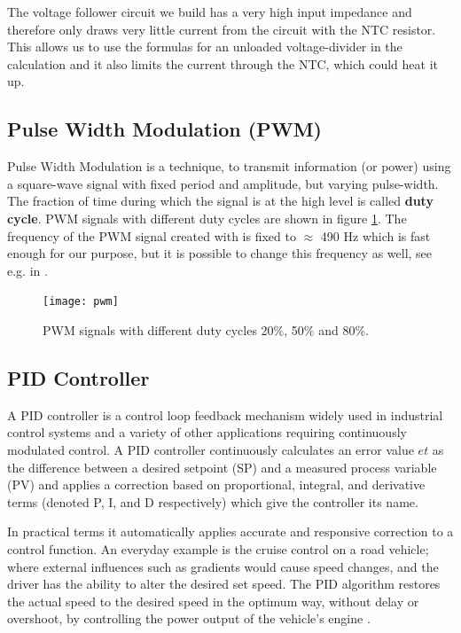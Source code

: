 The voltage follower circuit we build has a very high input impedance and therefore only draws very little current from the circuit with the NTC resistor. This allows us to use the formulas for an unloaded voltage-divider in the calculation and it also limits the current through the NTC, which could heat it up.

\subsection{Pulse Width Modulation (PWM)}

Pulse Width Modulation is a technique, to transmit information (or power) using a square-wave signal with fixed period and amplitude, but varying pulse-width. The fraction of time during which the signal is at the high level is called \textbf{duty cycle}. PWM signals with different duty cycles are shown in figure \ref{fig:pwm}. The frequency of the PWM signal created with  is fixed to $\approx$ 490 Hz which is fast enough for our purpose, but it is possible to change this frequency as well, see e.g. in \cite{avrguide}.

\begin{figure}[H]
\begin{center}
\texttt{[image: pwm]}
\caption{PWM signals with different duty cycles 20\%, 50\% and 80\%.}\label{fig:pwm}
\end{center}
\end{figure}


\subsection{PID Controller}\label{sec:pid}
A \ac{PID} controller is a control loop feedback mechanism widely used in industrial control systems and a variety of other applications requiring continuously modulated control. A \ac{PID} controller continuously calculates an error value $e{t}$ as the difference between a desired setpoint (SP) and a measured process variable (PV) and applies a correction based on proportional, integral, and derivative terms (denoted P, I, and D respectively) which give the controller its name.\par
In practical terms it automatically applies accurate and responsive correction to a control function. An everyday example is the cruise control on a road vehicle; where external influences such as gradients would cause speed changes, and the driver has the ability to alter the desired set speed. The PID algorithm restores the actual speed to the desired speed in the optimum way, without delay or overshoot, by controlling the power output of the vehicle's engine \cite{wiki:pid}.




